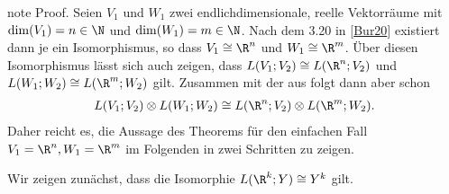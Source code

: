 \documentclass[letterpaper,10pt,german]{jupyterBook}
\begin{document}
\begin{sphinxadmonition}{note}
\sphinxAtStartPar
Proof. Seien \(V_1\) und \(W_1\) zwei endlich\sphinxhyphen{}dimensionale, reelle Vektorräume mit \(\operatorname{dim}(V_1) = n \in \N\) und \(\operatorname{dim}(W_1) = m \in \N\).
Nach dem  3.20 in {[}\hyperlink{cite.references:id2}{Bur20}{]} existiert dann je ein Isomorphismus, so dass \(V_1 \cong \R^n\) und \(W_1 \cong \R^m\).
Über diesen Isomorphismus lässt sich auch zeigen, dass \(L(V_1; V_2) \cong L(\R^n; V_2)\) und \(L(W_1; W_2) \cong L(\R^m; W_2)\) gilt.
Zusammen mit der  aus {\hyperref[\detokenize{vektoranalysis/tensor:lem:natISO}]{}} folgt dann aber schon
\begin{equation*}
\begin{split}L(V_1; V_2)\otimes L(W_1; W_2) \cong L(\R^n; V_2)\otimes L(\R^m; W_2).\end{split}
\end{equation*}
\sphinxAtStartPar
Daher reicht es, die Aussage des Theorems für den einfachen Fall \(V_1=\R^n, W_1=\R^m\) im Folgenden in zwei Schritten zu zeigen.

\sphinxAtStartPar
{} Wir zeigen zunächst, dass die Isomorphie \(L(\R^k; Y) \cong Y^k\) gilt.


\end{sphinxadmonition}
\end{document}
